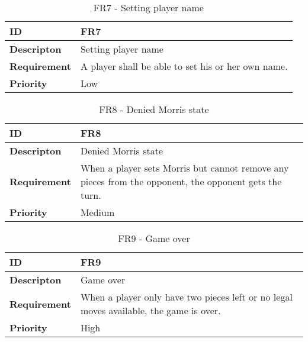 \begin{table}[h!]
\begin{tabular}{ | p{90pt} | p{270pt}  |}
\hline
\bf ID &  FR7 \\ \hline
\bf Descripton & Setting player name \\ \hline 
\bf Requirement & A player shall be able to set his or her own name.  \\ \hline
\bf Priority & Low \\ \hline

\end{tabular}

\caption{FR7 - Setting player name}

\end{table}


\begin{table}[h!]
\begin{tabular}{ | p{90pt} | p{270pt}  |}
\hline
\bf ID &  FR8  \\ \hline
\bf Descripton & Denied Morris state \\ \hline 
\bf Requirement & When a player sets Morris but cannot remove any pieces from the opponent, the opponent gets the turn.  \\ \hline
\bf Priority & Medium \\ \hline

\end{tabular}

\caption{FR8 - Denied Morris state}

\end{table}


\begin{table}[h!]
\begin{tabular}{ | p{90pt} | p{270pt}  |}
\hline
\bf ID &  FR9  \\ \hline
\bf Descripton & Game over \\ \hline 
\bf Requirement & When a player only have two pieces left or no legal moves available, the game is over.  \\ \hline
\bf Priority & High \\ \hline

\end{tabular}

\caption{FR9 - Game over}

\end{table}

\pagebreak



